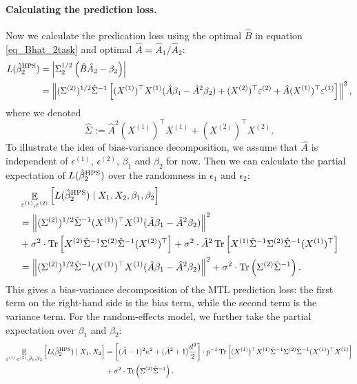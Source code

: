 \paragraph{Calculating the prediction loss.} Now we calculate the predication loss using the optimal $\hat B$ in equation \eqref{eq_Bhat_2task} and optimal $\hat A=\hat A_1/\hat A_2$:
\begin{align*}
L(\hat{\beta}_2^{\textup{HPS}}) &=\left|\Sigma_2^{1/2} \left( \hat B \hat A_2 - \beta_2\right)\right| \\
&=  \left\| (\Sigma^{(2)})^{1/2}\hat \Sigma^{-1} \left[(X^{(1)})^\top X^{(1)} (\hat A\beta_1-\hat A^2\beta_2)+ (X^{(2)})^\top \varepsilon^{(2)} + \hat A   (X^{(1)})^\top \varepsilon^{(1)} \right]\right\|^2,
\end{align*}
where we denoted
$$\hat \Sigma:= \hat A^2 (X^{(1)})^\top X^{(1)}  + (X^{(2)})^\top X^{(2)} .$$
To illustrate the idea of bias-variance decomposition, we assume that $\hat A$ is independent of $\epsilon^{(1)}$, $\epsilon^{(2)}$, $\beta_1$ and $\beta_2$ for now. Then we can calculate the partial expectation of $L(\hat{\beta}_2^{\textup{HPS}})$ over the randomness in $\epsilon_1$ and $\epsilon_2$:
 \begin{align}
	&\exarg{\epsilon^{(1)}, \epsilon^{(2)}}{L(\hat{\beta}_2^{\MTL}) \mid X_1, X_2,\beta_1,\beta_2} \nonumber \\
&	=  \bignorm{(\Sigma^{(2)})^{1/2}\hat\Sigma^{-1} (X^{(1)})^{\top}X^{(1)} (\hat A \beta_1 - \hat A^2\beta_2)}^2 \nonumber\\ %
			& + \sigma^2\cdot \bigtr{ X^{(2)} \hat\Sigma^{-1}\Sigma^{(2)}\hat\Sigma^{-1} (X^{(2)})^\top}+ \sigma^2\cdot \hat A^2 \bigtr{ X^{(1)} \hat\Sigma^{-1}\Sigma^{(2)}\hat\Sigma^{-1} (X^{(1)})^\top}\nonumber\\
			&= \bignorm{(\Sigma^{(2)})^{1/2}\hat\Sigma^{-1} (X^{(1)})^{\top}X^{(1)} (\hat A \beta_1 - \hat A^2\beta_2)}^2 +\sigma^2\cdot \tr\left(\Sigma^{(2)}\hat \Sigma^{-1}\right).\nonumber
\end{align}
This gives a bias-variance decomposition of the MTL prediction loss: the first term on the right-hand side is the bias term, while the second term is the variance term. For the random-effects model, we further take the partial expectation over $\beta_1$ and $\beta_2$: 
 \begin{align}
	\mathop{\mathbb{E}}_{\varepsilon^{(1)}, \varepsilon^{(2)},\beta_1,\beta_2}\left[ L(\hat{\beta}_2^{\textup{HPS}}) \mid X_1, X_2 \right]&	=  \left[(\hat A-1)^2 \kappa^2 + (\hat A^2+1)\frac{d^2}2\right] \cdot p^{-1}\operatorname{Tr}\left[ (X^{(1)})^{\top}X^{(1)} \hat\Sigma^{-1} \Sigma^{(2)} \hat\Sigma^{-1} (X^{(1)})^{\top}X^{(1)} \right]\nonumber \\
	&+\sigma^2\cdot \operatorname{Tr}\left(\Sigma^{(2)}\hat \Sigma^{-1}\right).
			\label{eq_var_2task}
\end{align}
